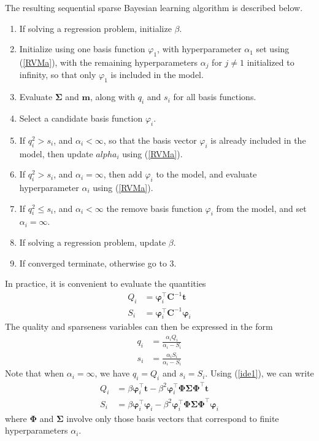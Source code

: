 \documentclass[a4paper]{report}
\renewcommand{\bf}{\mathbf}
\newcommand{\bs}{\boldsymbol}
\begin{document}
The resulting sequential sparse Bayesian learning algorithm is described below.
\begin{enumerate}
	\item If solving a regression problem, initialize $\beta$.
	\item Initialize using one basis function $\varphi_1$, with hyperparameter $\alpha_1$ set using (\ref{RVMa}), with the remaining hyperparameters $\alpha_j$ for $j \neq 1$ initialized to infinity, so that only $\varphi_1$ is included in the model.
	\item Evaluate $\bs{\Sigma}$ and $\bf{m}$, along with $q_i$ and $s_i$ for all basis functions.
	\item Select a candidate basis function $\varphi_i$.
	\item If $q_i^2 > s_i$, and $\alpha_i < \infty$, so that the basis vector $\varphi_i$ is already included in the model, then update $alpha_i$ using (\ref{RVMa}).
	\item If $q_i^2 > s_i$, and $\alpha_i = \infty$, then add $\varphi_i$ to the model, and evaluate hyperparameter $\alpha_i$ using (\ref{RVMa}).
	\item If $q_i^2 \leq s_i$, and $\alpha_i < \infty$ the remove basis function $\varphi_i$ from the model, and set $\alpha_i = \infty$.
	\item If solving a regression problem, update $\beta$.
	\item If converged terminate, otherwise go to 3. 
\end{enumerate}

In practice, it is convenient to evaluate the quantities
\begin{align}
	Q_i &= \bs{\varphi}_i^{\intercal}\bf{C}^{-1}\bf{t}\\
	S_i &= \bs{\varphi}_i^{\intercal} \bf{C}^{-1}\bs{\varphi}_i
\end{align}
The quality and sparseness variables can then be expressed in the form
\begin{align}
	q_i &= \frac{\alpha_i Q_i}{\alpha_i -S_i}\\
	s_i &= \frac{\alpha_i S_i}{\alpha_i-S_i}
\end{align}
Note that when $\alpha_i = \infty$, we have $q_i = Q_i$ and $s_i = S_i$. Using (\ref{ide1}), we can write
\begin{align}
	Q_i &= \beta \bs{\varphi}_i^{\intercal} \bf{t}-\beta^2 \bs{\varphi}_i^{\intercal} \bs{\Phi} \bs{\Sigma} \bs{\Phi}^{\intercal} \bf{t}\\
	S_i &= \beta \bs{\varphi}_i^{\intercal} \bs{\varphi}_i - \beta^2 \bs{\varphi}_i^{\intercal} \bs{\Phi} \bs{\Sigma}\bs{\Phi}^{\intercal} \bs{\varphi}_i
\end{align}
where $\bs{\Phi}$ and $\bs{\Sigma}$ involve only those basis vectors that correspond to finite hyperparameters $\alpha_i$.
\end{document}
